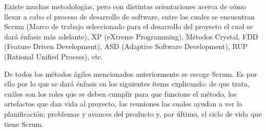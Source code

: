 Existe muchas metodologías, pero con distintas orientaciones acerca de cómo llevar a cabo el proceso de desarrollo de software, entre las cuales se encuentran Scrum (Marco de trabajo seleccionado para el desarrollo del proyecto el cual se dará énfasis más adelante), XP (eXtreme Programming), Métodos Crystal, FDD (Feature Driven Development), ASD (Adaptive Software Development), RUP (Rational Unified Process), etc.

De todos los métodos ágiles mencionados anteriormente se escoge Scrum. Es por ello por lo que se dará énfasis en los siguientes ítems explicando: de que trata, cuáles son los roles que se deben cumplir para que funcione el método, los artefactos que dan vida al proyecto, las reuniones las cuales ayudan a ver la planificación; problemas y avances del producto y, por último, el ciclo de vida que tiene Scrum.
